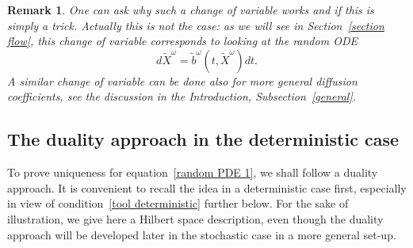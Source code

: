 \documentclass[a4paper,10pt]{article}
\newtheorem{remark}[theorem]{Remark}
\newcommand\1{\mathbbm{1}}
\newcommand{\td}{\tilde}
\numberwithin{equation}{section}
\begin{document}
\begin{remark}
One can ask why such a change of variable works and if this is simply a trick. Actually this is not the case: as we will see in Section~\ref{section flow}, this change of variable corresponds to looking at the random ODE
\begin{equation*}
d\td{X}^\omega=\td{b}^\omega(t,\td{X}^\omega)dt.
\end{equation*}
A similar change of variable can be done also for more general diffusion coefficients, see the discussion in the Introduction, Subsection~\ref{general}.
\end{remark}

\subsection{The duality approach in the deterministic
case\label{subsection determ duality}}

To prove uniqueness for equation~\eqref{random PDE 1}, we shall follow a duality approach. It is convenient to recall the idea in a deterministic case first, especially in view of condition~\eqref{tool deterministic} further below. For the sake of illustration, we give here a Hilbert space description, even though the duality approach will be developed later in the stochastic case in a more general set-up. 
\end{document}

